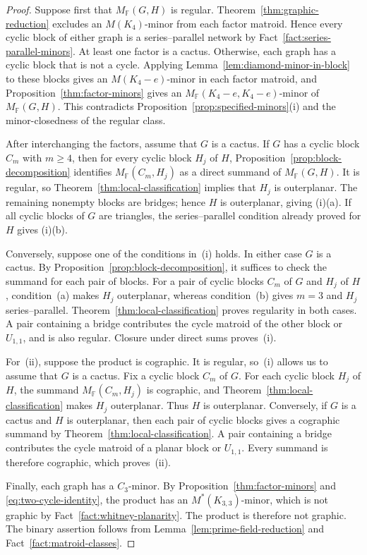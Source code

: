 \documentclass[12pt,a4paper]{article}
\numberwithin{equation}{section}
\newcommand{\F}{\mathbb F}
\theoremstyle{definition}
\theoremstyle{remark}
\begin{document}
\begin{proof}
Suppose first that \(M_{\F}(G,H)\) is regular.
Theorem~\ref{thm:graphic-reduction} excludes an \(M(K_4)\)-minor
from each factor matroid.  Hence every cyclic block of either graph
is a series--parallel network by Fact~\ref{fact:series-parallel-minors}.
At least one factor is a cactus.  Otherwise, each graph has a
cyclic block that is not a cycle.  Applying
Lemma~\ref{lem:diamond-minor-in-block} to these blocks gives an
\(M(K_4-e)\)-minor in each factor matroid, and
Proposition~\ref{thm:factor-minors} gives an
\(M_{\F}(K_4-e,K_4-e)\)-minor of \(M_{\F}(G,H)\).
This contradicts Proposition~\ref{prop:specified-minors}\textup{(i)}
and the minor-closedness of the regular class.

After interchanging the factors, assume that \(G\) is a cactus.
If \(G\) has a cyclic block \(C_m\) with \(m\ge4\), then for
every cyclic block \(H_j\) of \(H\),
Proposition~\ref{prop:block-decomposition} identifies
\(M_{\F}(C_m,H_j)\) as a direct summand of \(M_{\F}(G,H)\).
It is regular, so Theorem~\ref{thm:local-classification} implies
that \(H_j\) is outerplanar.  The remaining nonempty blocks are
bridges; hence \(H\) is outerplanar, giving \textup{(i)(a)}.  If all cyclic blocks of
\(G\) are triangles, the series--parallel condition already proved
for \(H\) gives \textup{(i)(b)}.

Conversely, suppose one of the conditions in~\textup{(i)} holds.
In either case \(G\) is a cactus.  By
Proposition~\ref{prop:block-decomposition}, it suffices to check
the summand for each pair of blocks.  For a pair of cyclic blocks
\(C_m\) of \(G\) and \(H_j\) of \(H\), condition~\textup{(a)}
makes \(H_j\) outerplanar, whereas condition~\textup{(b)} gives
\(m=3\) and \(H_j\) series--parallel.
Theorem~\ref{thm:local-classification} proves regularity in both
cases.  A pair containing a bridge contributes the cycle matroid
of the other block or \(U_{1,1}\), and is also regular.
Closure under direct sums proves~\textup{(i)}.

For~\textup{(ii)}, suppose the product is cographic.  It is
regular, so~\textup{(i)} allows us to assume that \(G\) is a cactus.
Fix a cyclic block \(C_m\) of \(G\).  For each cyclic block
\(H_j\) of \(H\), the summand \(M_{\F}(C_m,H_j)\) is cographic,
and Theorem~\ref{thm:local-classification} makes \(H_j\) outerplanar.
Thus \(H\) is outerplanar.
Conversely, if \(G\) is a cactus and \(H\) is outerplanar, then
each pair of cyclic blocks gives a cographic summand by
Theorem~\ref{thm:local-classification}.  A pair containing a bridge
contributes the cycle matroid of a planar block or \(U_{1,1}\).
Every summand is therefore cographic, which proves~\textup{(ii)}.

Finally, each graph has a \(C_3\)-minor.  By
Proposition~\ref{thm:factor-minors} and \eqref{eq:two-cycle-identity},
the product has an \(M^*(K_{3,3})\)-minor, which is not graphic
by Fact~\ref{fact:whitney-planarity}.  The product is therefore
not graphic.  The binary assertion follows from
Lemma~\ref{lem:prime-field-reduction} and
Fact~\ref{fact:matroid-classes}.
\end{proof}
\end{document}
